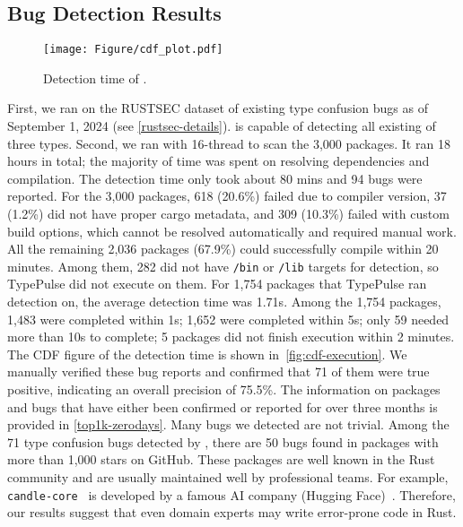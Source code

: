 \subsection{Bug Detection Results} \label{evaluation:effectiveness}



\begin{figure}[t]
    \centering
    \texttt{[image: Figure/cdf\_plot.pdf]}
    \caption{Detection time of \TN.}
    \label{fig:cdf-execution}
\end{figure}



First, we ran \TN on the RUSTSEC dataset of existing type confusion bugs 
{as of September 1, 2024 (see \autoref{rustsec-details})}.
\TN is capable of detecting all existing \bugs of three types. Second, {we ran \TN with 16-thread to scan the 3,000 packages.} {It ran 18 hours in total; the majority of time was spent on resolving dependencies and compilation. The detection time only took about 80 mins and 94 bugs were reported. For the 3,000 packages, 618 (20.6\%) failed due to compiler version, 37 (1.2\%) did not have proper cargo metadata, and 309 (10.3\%) failed with custom build options, which cannot be resolved automatically and required manual work. All the remaining 2,036 packages (67.9\%) could successfully compile within 20 minutes. Among them, 282 did not have \texttt{/bin} or \texttt{/lib} targets for detection, so TypePulse did not execute on them. For 1,754 packages that TypePulse ran detection on, the average detection time was 1.71s. Among the 1,754 packages, 1,483 were completed within 1s; 1,652 were completed within 5s; only 59 needed more than 10s to complete; 5 packages did not finish execution within 2 minutes. The CDF figure of the detection time is shown in~\autoref{fig:cdf-execution}.} {We manually verified these bug reports and confirmed that {71} of them were true positive, indicating an overall precision of {75.5\%}.} {The information on packages and bugs that have either been confirmed or reported for over three months is provided in \autoref{top1k-zerodays}}. Many bugs we detected are not trivial. {Among the 71 type confusion bugs detected by \TN, there are {50} bugs found in packages with more than 1,000 stars on GitHub}. These packages are well known in the Rust community and are usually maintained well by professional teams. For example, {\tt candle-core}~\cite{candle-core} is developed by a famous AI company (Hugging Face)~\cite{HuggingFace}. Therefore, our results suggest that even domain experts may write error-prone code in Rust.




